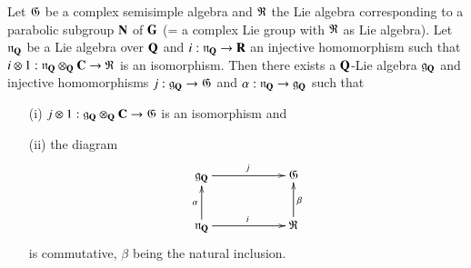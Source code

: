 \setcounter{definition}{30}
\begin{theorem}\label{art9-thm3.31}
Let $\mathfrak{G}$ be a complex semisimple algebra and $\mathfrak{R}$ the Lie algebra corresponding to a parabolic subgroup $\mathbf{N}$ of $\mathbf{G}$ (= a complex Lie group with $\mathfrak{R}$ as Lie algebra). Let $\mathfrak{n}_{\mathbf{Q}}$ be a Lie algebra over $\mathbf{Q}$ and $i: \mathfrak{n}_{\mathbf{Q}} \to \mathbf{R}$ an injective homomorphism such that $i \otimes 1: \mathfrak{n}_{\mathbf{Q}} \otimes_{\mathbf{Q}} \mathbf{C} \to \mathfrak{R}$ is an isomorphism. Then there exists a $\mathbf{Q}$-Lie algebra $\mathfrak{g}_{\mathbf{Q}}$ and injective homomorphisms $j : \mathfrak{g}_{\mathbf{Q}} \to \mathfrak{G}$ and $\alpha : \mathfrak{n}_{\mathbf{Q}} \to \mathfrak{g}_{\mathbf{Q}}$ such that 
\begin{itemize}
\item[(i)] $j \otimes 1 : \mathfrak{g}_{\mathbf{Q}} \otimes_{\mathbf{Q}} \mathbf{C} \to \mathfrak{G}$ is an isomorphism and 

\item[(ii)] the diagram 
$$
\xymatrix@C=2cm{
\fg_\bQ \ar[r]^j & \fG\\
\fn_\bQ \ar[r]^i \ar[u]^-\alpha & \fR\ar[u]_\beta
}
$$
is commutative, $\beta$ being the natural inclusion.
\end{itemize}
\end{theorem}

\setcounter{subsection}{31}
